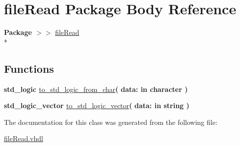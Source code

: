 \hypertarget{class__file_read}{\section{file\-Read Package Body Reference}
\label{class__file_read}
}
{\bfseries Package $>$$>$ }\hyperlink{classfile_read}{file\-Read}\\*
\subsection*{Functions}
 \begin{DoxyCompactItemize}
\item 
\hypertarget{class__file_read_a130c40cc008de8d3ccb7e18201a712b9}{{\bfseries {\bfseries \textcolor{comment}{std\-\_\-logic}\textcolor{vhdlchar}{ }}} \hyperlink{class__file_read_a130c40cc008de8d3ccb7e18201a712b9}{to\-\_\-std\-\_\-logic\-\_\-from\-\_\-char}{\bfseries  ( }{\bfseries \textcolor{vhdlchar}{data\-: }\textcolor{stringliteral}{in }{\bfseries \textcolor{comment}{character}\textcolor{vhdlchar}{ }}}{\bfseries  )} }\label{class__file_read_a130c40cc008de8d3ccb7e18201a712b9}

\item 
\hypertarget{class__file_read_a2f37cc7e400e439a39996222cc6c4773}{{\bfseries {\bfseries \textcolor{comment}{std\-\_\-logic\-\_\-vector}\textcolor{vhdlchar}{ }}} \hyperlink{class__file_read_a2f37cc7e400e439a39996222cc6c4773}{to\-\_\-std\-\_\-logic\-\_\-vector}{\bfseries  ( }{\bfseries \textcolor{vhdlchar}{data\-: }\textcolor{stringliteral}{in }{\bfseries \textcolor{comment}{string}\textcolor{vhdlchar}{ }}}{\bfseries  )} }\label{class__file_read_a2f37cc7e400e439a39996222cc6c4773}

\end{DoxyCompactItemize}


The documentation for this class was generated from the following file\-:\begin{DoxyCompactItemize}
\item 
\hyperlink{file_read_8vhdl}{file\-Read.\-vhdl}\end{DoxyCompactItemize}
